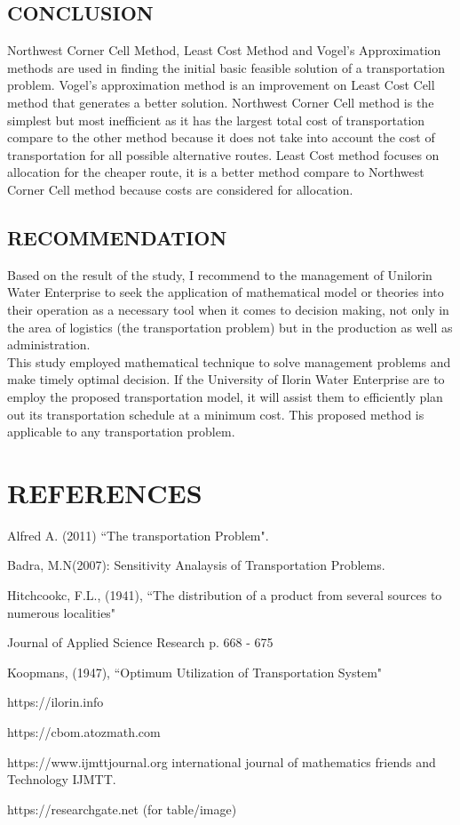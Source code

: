 \documentclass[12pt]{report}
\newcommand{\sps}{\\[0.2cm]}
\begin{document}
	\section{CONCLUSION}
	Northwest Corner Cell Method, Least Cost Method and Vogel's Approximation methods are used in finding the initial basic feasible solution of a transportation problem. Vogel's approximation method is an improvement on Least Cost Cell method that generates a better solution. Northwest Corner Cell method is the simplest but most inefficient as it has the largest total cost of transportation compare to the other method because it does not take into account the cost of transportation for all possible alternative routes. Least Cost method focuses on allocation for the cheaper route, it is a better method compare to Northwest Corner Cell method because costs are considered for allocation.

	\section{RECOMMENDATION}
	Based on the result of the study, I recommend to the management of Unilorin Water Enterprise to seek the application of mathematical model or theories into their operation as a necessary tool when it comes to decision making, not only in the area of logistics (the transportation problem) but in the production as well as administration.\sps
	This study employed mathematical technique to solve management problems and make timely optimal decision. If the University of Ilorin Water Enterprise are to employ the proposed transportation model, it will assist them to efficiently plan out its transportation schedule at a minimum cost. This proposed method is applicable to any transportation problem.
	
	\chapter*{REFERENCES}
	
	\begin{description}
		\item Alfred A. (2011) ``The transportation Problem".
		\item Badra, M.N(2007): Sensitivity Analaysis of Transportation Problems.
		\item Hitchcookc, F.L., (1941), ``The distribution of a product from several sources to numerous localities"
		\item Journal of Applied Science Research p. 668 - 675
		\item Koopmans, (1947), ``Optimum Utilization of Transportation System"
		\item https://ilorin.info
		\item https://cbom.atozmath.com
		\item https://www.ijmttjournal.org international journal of mathematics friends and Technology IJMTT.
		\item https://researchgate.net (for table/image)
	\end{description}
	
\end{document}
